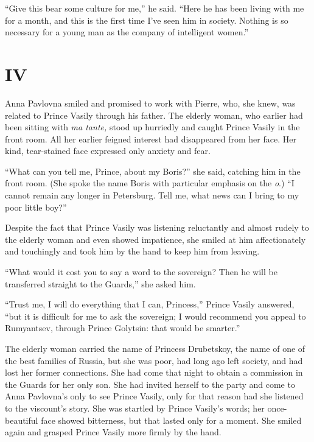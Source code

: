 ``Give this bear some culture for me,'' he said. ``Here he has been living with me for a month, and this is the first time I've seen him in society. Nothing is so necessary for a young man as the company of intelligent women.'' %

\section*{IV} %

Anna Pavlovna smiled and promised to work with Pierre, who, she knew, was related to Prince Vasily through his father. The elderly woman, who earlier had been sitting with \textit{ma tante,} stood up hurriedly and caught Prince Vasily in the front room. All her earlier feigned interest had disappeared from her face. Her kind, tear-stained face expressed only anxiety and fear.

``What can you tell me, Prince, about my Boris?'' she said, catching him in the front room. (She spoke the name Boris with particular emphasis on the \textit{o}.) ``I cannot remain any longer in Petersburg. Tell me, what news can I bring to my poor little boy?'' %

Despite the fact that Prince Vasily was listening reluctantly and almost rudely to the elderly woman and even showed impatience, she smiled at him affectionately and touchingly and took him by the hand to keep him from leaving.

``What would it cost you to say a word to the sovereign? Then he will be transferred straight to the Guards,'' she asked him. %

``Trust me, I will do everything that I can, Princess,'' Prince Vasily answered, ``but it is difficult for me to ask the sovereign; I would recommend you appeal to Rumyantsev, through Prince Golytsin: that would be smarter.'' %

The elderly woman carried the name of Princess Drubetskoy, the name of one of the best families of Russia, but she was poor, had long ago left society, and had lost her former connections. She had come that night to obtain a commission in the Guards for her only son. She had invited herself to the party and come to Anna Pavlovna's only to see Prince Vasily, only for that reason had she listened to the viscount's story. She was startled by Prince Vasily's words; her once-beautiful face showed bitterness, but that lasted only for a moment. She smiled again and grasped Prince Vasily more firmly by the hand.

